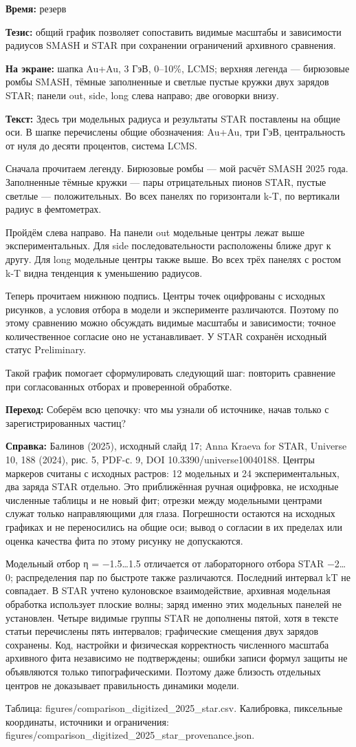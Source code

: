 \textbf{Время:} резерв

\textbf{Тезис:} общий график позволяет сопоставить видимые масштабы и зависимости радиусов SMASH и STAR при сохранении ограничений архивного сравнения.

\textbf{На экране:} шапка Au+Au, 3 ГэВ, 0–10\%, LCMS; верхняя легенда — бирюзовые ромбы SMASH, тёмные заполненные и светлые пустые кружки двух зарядов STAR; панели out, side, long слева направо; две оговорки внизу.

\textbf{Текст:} Здесь три модельных радиуса и результаты STAR поставлены на общие оси. В шапке перечислены общие обозначения: Au+Au, три ГэВ, центральность от нуля до десяти процентов, система LCMS.

Сначала прочитаем легенду. Бирюзовые ромбы — мой расчёт SMASH 2025 года. Заполненные тёмные кружки — пары отрицательных пионов STAR, пустые светлые — положительных. Во всех панелях по горизонтали k-T, по вертикали радиус в фемтометрах.

Пройдём слева направо. На панели out модельные центры лежат выше экспериментальных. Для side последовательности расположены ближе друг к другу. Для long модельные центры также выше. Во всех трёх панелях с ростом k-T видна тенденция к уменьшению радиусов.

Теперь прочитаем нижнюю подпись. Центры точек оцифрованы с исходных рисунков, а условия отбора в модели и эксперименте различаются. Поэтому по этому сравнению можно обсуждать видимые масштабы и зависимости; точное количественное согласие оно не устанавливает. У STAR сохранён исходный статус Preliminary.

Такой график помогает сформулировать следующий шаг: повторить сравнение при согласованных отборах и проверенной обработке.

\textbf{Переход:} Соберём всю цепочку: что мы узнали об источнике, начав только с зарегистрированных частиц?

\textbf{Справка:} Балинов (2025), исходный слайд 17; Anna Kraeva for STAR, Universe 10, 188 (2024), рис. 5, PDF-с. 9, DOI 10.3390/universe10040188. Центры маркеров считаны с исходных растров: 12 модельных и 24 экспериментальных, два заряда STAR отдельно. Это приближённая ручная оцифровка, не исходные численные таблицы и не новый фит; отрезки между модельными центрами служат только направляющими для глаза. Погрешности остаются на исходных графиках и не переносились на общие оси; вывод о согласии в их пределах или оценка качества фита по этому рисунку не допускаются.

Модельный отбор η = −1.5…1.5 отличается от лабораторного отбора STAR −2…0; распределения пар по быстроте также различаются. Последний интервал kT не совпадает. В STAR учтено кулоновское взаимодействие, архивная модельная обработка использует плоские волны; заряд именно этих модельных панелей не установлен. Четыре видимые группы STAR не дополнены пятой, хотя в тексте статьи перечислены пять интервалов; графические смещения двух зарядов сохранены. Код, настройки и физическая корректность численного масштаба архивного фита независимо не подтверждены; ошибки записи формул защиты не объявляются только типографическими. Поэтому даже близость отдельных центров не доказывает правильность динамики модели.

Таблица: figures/comparison\_digitized\_2025\_star.csv. Калибровка, пиксельные координаты, источники и ограничения: figures/comparison\_digitized\_2025\_star\_provenance.json.
